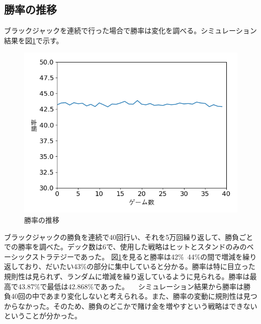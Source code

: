 \subsection{勝率の推移}
ブラックジャックを連続で行った場合で勝率は変化を調べる。シミュレーション結果を図\ref{win}で示す。
\begin{figure}[H]
 \begin{center} 
  \includegraphics[width=0.7\linewidth]{./figure/win}
  \caption{勝率の推移\label{win}}
 \end{center}
\end{figure}
ブラックジャックの勝負を連続で40回行い、それを5万回繰り返して、勝負ごとでの勝率を調べた。デック数は6で、使用した戦略はヒットとスタンドのみのベーシックストラテジーであった。
図\ref{win}を見ると勝率は42\%~44\%の間で増減を繰り返しており、だいたい43\%の部分に集中していると分かる。勝率は特に目立った規則性は見られず、ランダムに増減を繰り返しているように見られる。勝率は最高で43.87\%で最低は42.868\%であった。
　シミュレーション結果から勝率は勝負40回の中であまり変化しないと考えられる。また、勝率の変動に規則性は見つからなかった。そのため、勝負のどこかで賭け金を増やすという戦略はできないということが分かった。


